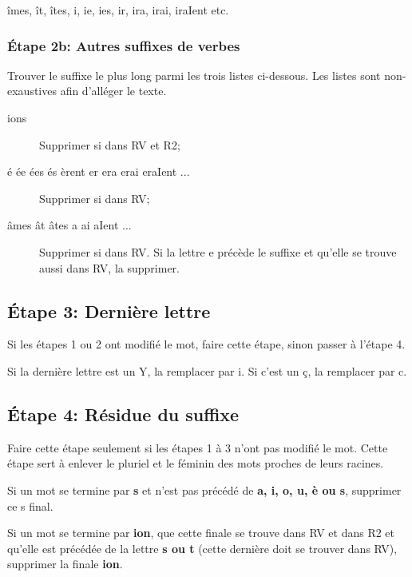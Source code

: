 îmes, ît, îtes, i, ie, ies, ir, ira, irai, iraIent etc.

\subsubsection*{Étape 2b: Autres suffixes de verbes}

Trouver le suffixe le plus long parmi les trois listes ci-dessous.
Les listes sont non-exaustives afin d'alléger le texte.

\begin{description}
  \item[ions]
  
  Supprimer si dans RV et R2;
  
  \item[é ée ées és èrent er era erai eraIent ...]
  
  Supprimer si dans RV;
  
  \item[âmes ât âtes a ai aIent ...]
  
  Supprimer si dans RV. Si la lettre e précède le suffixe et qu'elle se trouve aussi dans RV, la supprimer.
\end{description}

\subsection*{Étape 3: Dernière lettre}

Si les étapes 1 ou 2 ont modifié le mot, faire cette étape, sinon passer à l'étape 4.

Si la dernière lettre est un Y, la remplacer par i.
Si c'est un ç, la remplacer par c.

\subsection*{Étape 4: Résidue du suffixe}

Faire cette étape seulement si les étapes 1 à 3 n'ont pas modifié le mot.
Cette étape sert à enlever le pluriel et le féminin des mots proches de leurs racines.

Si un mot se termine par \textbf{s} et n'est pas précédé de \textbf{a, i, o, u, è ou s}, supprimer ce s final.

Si un mot se termine par \textbf{ion}, que cette finale se trouve dans RV et dans R2 et qu'elle est précédée de la lettre \textbf{s ou t} (cette dernière doit se trouver dans RV), supprimer la finale \textbf{ion}.

